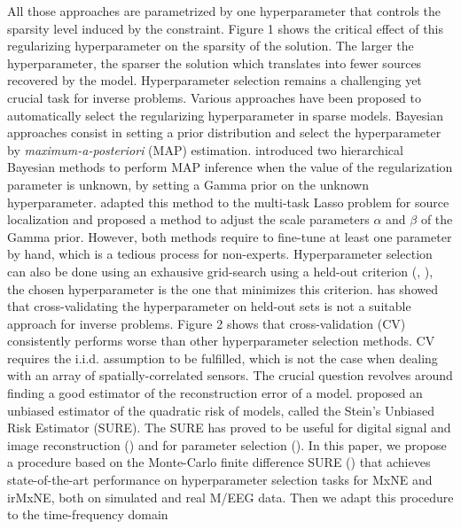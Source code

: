 All those approaches are parametrized by one hyperparameter that controls the sparsity level
induced by the constraint. Figure 1 shows the critical effect of this regularizing hyperparameter 
on the sparsity of the solution. The larger the hyperparameter, the sparser the solution which translates
into fewer sources recovered by the model. Hyperparameter selection remains a challenging yet crucial task
for inverse problems. Various approaches have been proposed to automatically select the regularizing 
hyperparameter in sparse models. Bayesian approaches consist in setting a prior distribution 
and select the hyperparameter by \textit{maximum-a-posteriori} (MAP) estimation. 
\cite{Pereyra_BioucasDias_Figueiredo_2015} introduced two hierarchical Bayesian methods to perform MAP 
inference when the value of the regularization parameter is unknown, by setting a Gamma prior on the 
unknown hyperparameter. \cite{Bekhti_Badeau_Gramfort_2017} adapted this method to the multi-task Lasso problem
for source localization and proposed a method to adjust the scale parameters $\alpha$ and $\beta$
of the Gamma prior. However, both methods require to fine-tune at least one parameter by hand, which is a
tedious process for non-experts. Hyperparameter selection can also be done using an exhausive
grid-search using a held-out criterion (\cite{Bergstra_Bengio12}, \cite{BergstraBardenetBengioKegl2011}), 
the chosen hyperparameter is the one that minimizes this criterion. \cite{Pedregosa16} has 
showed that cross-validating the hyperparameter on held-out sets is not a suitable approach for inverse 
problems. Figure 2 shows that cross-validation (CV) consistently performs worse than other 
hyperparameter selection methods. CV requires the i.i.d. assumption to be fulfilled, which is 
not the case when dealing with an array of spatially-correlated sensors. The crucial question revolves around
finding a good estimator of the reconstruction error of a model. \cite{Stein81} proposed an unbiased estimator
of the quadratic risk of models, called the Stein's Unbiased Risk Estimator (SURE). The SURE has proved to be 
useful for digital signal and image reconstruction (\cite{Pesquet_Benazza_Chaux_2009}) and for
parameter selection (\cite{Deledalle_Vaiter_Fadili_Peyre14}). In this paper, we propose a procedure based 
on the Monte-Carlo finite difference SURE (\cite{Deledalle_Vaiter_Fadili_Peyre14}) that achieves 
state-of-the-art performance on hyperparameter selection tasks for MxNE and irMxNE,
both on simulated and real M/EEG data. Then we adapt this procedure to the time-frequency domain
